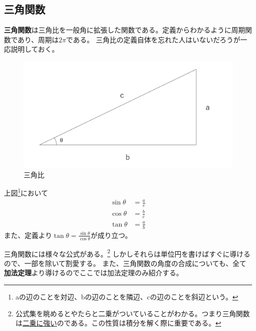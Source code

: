\documentclass[a4j,dvipdfmx]{jsarticle}
\begin{document}
            \subsection{三角関数}
                \textbf{三角関数}は三角比を一般角に拡張した関数である。定義からわかるように周期関数であり、周期は$2\pi$である。
                三角比の定義自体を忘れた人はいないだろうが一応説明しておく。
                \begin{figure}[h]
                    \centering
                    \includegraphics[keepaspectratio,scale=0.5]{img/QuuNote/triangleFunc.png}
                    \caption{三角比}
                \end{figure}

                上図\footnote{aの辺のことを対辺、bの辺のことを隣辺、cの辺のことを斜辺という。}において
                \begin{align}
                    \sin \theta &= \frac{a}{c}\\
                    \cos \theta &= \frac{b}{c}\\
                    \tan \theta &= \frac{a}{b}
                \end{align}
                また、定義より$\displaystyle\tan \theta = \frac{\sin \theta}{\cos \theta}$が成り立つ。

                三角関数には様々な公式がある。\footnote{公式集を眺めるとやたらと二乗がついていることがわかる。つまり三角関数は\underline{二乗に強い}のである。この性質は積分を解く際に重要である。}
                しかしそれらは単位円を書けばすぐに導けるので、一部を除いて割愛する。
                また、三角関数の角度の合成についても、全て\textbf{加法定理}より導けるのでここでは加法定理のみ紹介する。
\end{document}
